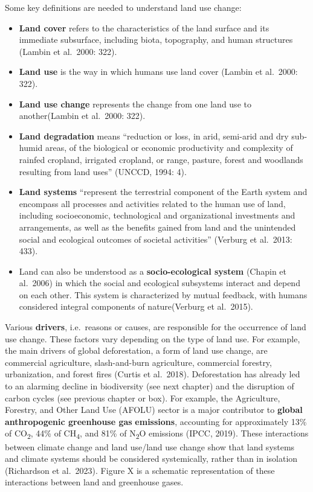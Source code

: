 \documentclass[
  a4paper,
  openany]{book}
\begin{document}
Some key definitions are needed to understand land use change:

\begin{itemize}
\item
  \textbf{Land cover} refers to the characteristics of the land surface
  and its immediate subsurface, including biota, topography, and human
  structures (Lambin et al.~2000: 322).
\item
  \textbf{Land use} is the way in which humans use land cover (Lambin et
  al.~2000: 322).
\item
  \textbf{Land use change} represents the change from one land use to
  another(Lambin et al.~2000: 322).
\item
  \textbf{Land degradation} means ``reduction or loss, in arid,
  semi-arid and dry sub-humid areas, of the biological or economic
  productivity and complexity of rainfed cropland, irrigated cropland,
  or range, pasture, forest and woodlands resulting from land uses''
  (UNCCD, 1994: 4).
\item
  \textbf{Land systems} ``represent the terrestrial component of the
  Earth system and encompass all processes and activities related to the
  human use of land, including socioeconomic, technological and
  organizational investments and arrangements, as well as the benefits
  gained from land and the unintended social and ecological outcomes of
  societal activities'' (Verburg et al.~2013: 433).
\item
  Land can also be understood as a \textbf{socio-ecological system}
  (Chapin et al.~2006) in which the social and ecological subsystems
  interact and depend on each other. This system is characterized by
  mutual feedback, with humans considered integral components of
  nature(Verburg et al.~2015).
\end{itemize}

Various \textbf{drivers}, i.e.~reasons or causes, are responsible for
the occurrence of land use change. These factors vary depending on the
type of land use. For example, the main drivers of global deforestation,
a form of land use change, are commercial agriculture, slash-and-burn
agriculture, commercial forestry, urbanization, and forest fires (Curtis
et al.~2018). Deforestation has already led to an alarming decline in
biodiversity (see next chapter) and the disruption of carbon cycles (see
previous chapter or box). For example, the Agriculture, Forestry, and
Other Land Use (AFOLU) sector is a major contributor to \textbf{global
anthropogenic greenhouse gas} \textbf{emissions}, accounting for
approximately 13\% of CO\textsubscript{2}, 44\% of CH\textsubscript{4},
and 81\% of N\textsubscript{2}O emissions (IPCC, 2019). These
interactions between climate change and land use/land use change show
that land systems and climate systems should be considered systemically,
rather than in isolation (Richardson et al.~2023). Figure X is a
schematic representation of these interactions between land and
greenhouse gases.
\end{document}

